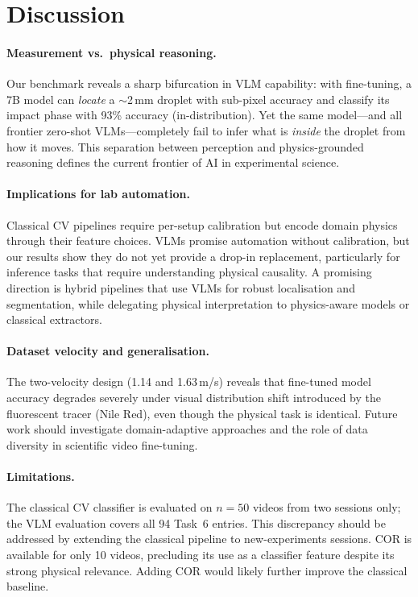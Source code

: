 \documentclass[10pt,twocolumn,letterpaper]{article}
\begin{document}
\section{Discussion}
\label{sec:discussion}

\paragraph{Measurement vs.\ physical reasoning.}
Our benchmark reveals a sharp bifurcation in VLM capability:
with fine-tuning, a 7B model can \emph{locate} a $\sim$2\,mm droplet
with sub-pixel accuracy and classify its impact phase with 93\% accuracy
(in-distribution).
Yet the same model—and all frontier zero-shot VLMs—completely fail to infer
what is \emph{inside} the droplet from how it moves.
This separation between perception and physics-grounded reasoning defines the
current frontier of AI in experimental science.

\paragraph{Implications for lab automation.}
Classical CV pipelines require per-setup calibration but encode
domain physics through their feature choices.
VLMs promise automation without calibration, but our results show they do
not yet provide a drop-in replacement, particularly for inference tasks
that require understanding physical causality.
A promising direction is hybrid pipelines that use VLMs for robust
localisation and segmentation, while delegating physical interpretation
to physics-aware models or classical extractors.

\paragraph{Dataset velocity and generalisation.}
The two-velocity design (1.14 and 1.63\,m/s) reveals that fine-tuned
model accuracy degrades severely under visual distribution shift
introduced by the fluorescent tracer (Nile Red), even though the physical
task is identical.
Future work should investigate domain-adaptive approaches and the role of
data diversity in scientific video fine-tuning.

\paragraph{Limitations.}
The classical CV classifier is evaluated on $n{=}50$ videos from two sessions
only; the VLM evaluation covers all 94 Task~6 entries.
This discrepancy should be addressed by extending the classical pipeline to
new-experiments sessions.
COR is available for only 10 videos, precluding its use as a classifier
feature despite its strong physical relevance.
Adding COR would likely further improve the classical baseline.
\end{document}

